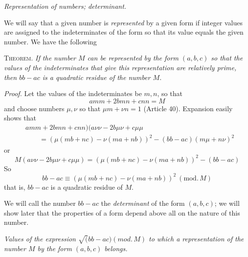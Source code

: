 \begin{center}
\textit{Representation of numbers; determinant.}
\end{center}

We will say that a given number is \textit{represented} by a given form if integer values are assigned to the indeterminates of the form so that its value equals the given number. We have the following

\textsc{Theorem.} \textit{If the number $M$ can be represented by the form $(a,b,c)$ so that the values of the indeterminates that give this representation are relatively prime, then $bb-ac$ is a quadratic residue of the number $M$.}

\textit{Proof.} Let the values of the indeterminates be $m,n$, so that
\[
amm+2bmn+cnn=M
\]
and choose numbers $\mu,\nu$ so that $\mu m+\nu n=1$ (Article 40). Expansion easily shows that
\[
\begin{aligned}
&amm+2bmn+cnn)(a\nu\nu-2b\mu\nu+c\mu\mu\\
&\qquad={}(\mu(mb+nc)-\nu(ma+nb))^2-(bb-ac)(m\mu+n\nu)^2
\end{aligned}
\]
or
\[
M(a\nu\nu-2b\mu\nu+c\mu\mu)=(\mu(mb+nc)-\nu(ma+nb))^2-(bb-ac)
\]
So
\[
bb-ac\equiv(\mu(mb+nc)-\nu(ma+nb))^2\ (\mathrm{mod.}\,M)
\]
that is, $bb-ac$ is a quadratic residue of $M$.

We will call the number $bb-ac$ the \textit{determinant} of the form $(a,b,c)$; we will show later that the properties of a form depend above all on the nature of this number.

\begin{center}
\textit{Values of the expression $\surd(bb-ac)(\mathit{mod.}\,M)$ to which a representation of the number $M$ by the form $(a,b,c)$ belongs.}
\end{center}

